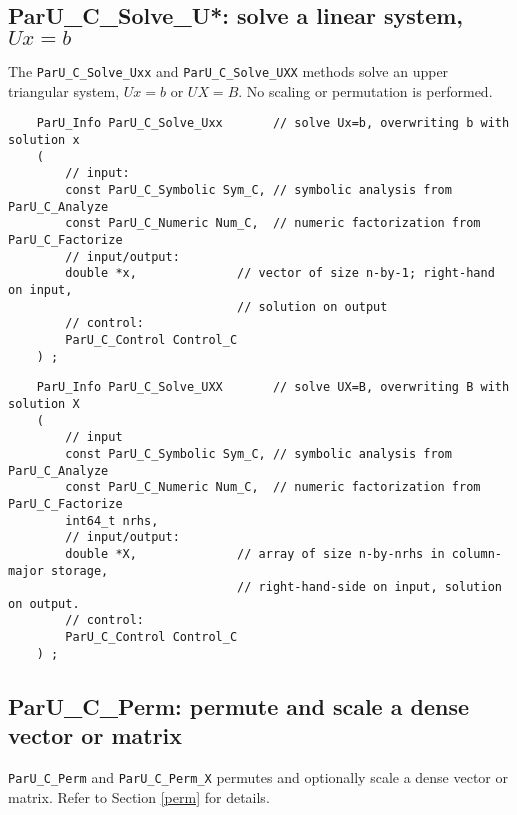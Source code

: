 \documentclass[12pt]{article}
\begin{document}
\subsection{{\sf ParU\_C\_Solve\_U*}: solve a linear system, $Ux=b$}

    The \verb'ParU_C_Solve_Uxx' and \verb'ParU_C_Solve_UXX' methods solve an
    upper triangular system, $Ux=b$ or $UX=B$.  No scaling or permutation is
    performed.

    {\footnotesize
    \begin{verbatim}
    ParU_Info ParU_C_Solve_Uxx       // solve Ux=b, overwriting b with solution x
    (
        // input:
        const ParU_C_Symbolic Sym_C, // symbolic analysis from ParU_C_Analyze
        const ParU_C_Numeric Num_C,  // numeric factorization from ParU_C_Factorize
        // input/output:
        double *x,              // vector of size n-by-1; right-hand on input,
                                // solution on output
        // control:
        ParU_C_Control Control_C
    ) ; \end{verbatim} }

    {\footnotesize
    \begin{verbatim}
    ParU_Info ParU_C_Solve_UXX       // solve UX=B, overwriting B with solution X
    (
        // input
        const ParU_C_Symbolic Sym_C, // symbolic analysis from ParU_C_Analyze
        const ParU_C_Numeric Num_C,  // numeric factorization from ParU_C_Factorize
        int64_t nrhs,
        // input/output:
        double *X,              // array of size n-by-nrhs in column-major storage,
                                // right-hand-side on input, solution on output.
        // control:
        ParU_C_Control Control_C
    ) ; \end{verbatim} }

\subsection{{\sf ParU\_C\_Perm}: permute and scale a dense vector or matrix}

    \verb'ParU_C_Perm' and \verb'ParU_C_Perm_X' permutes and optionally scale a
    dense vector or matrix.  Refer to Section \ref{perm} for details.
\end{document}
